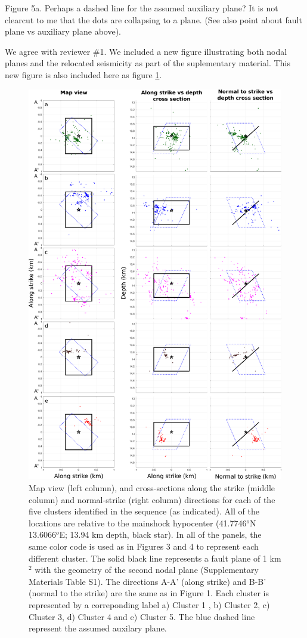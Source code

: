 \documentclass[10pt]{extarticle}
\begin{document}
\begin{ReviewerComment}{1}
\noindent 
Figure 5a. Perhaps a dashed line for the assumed auxiliary plane? It is not clearcut to me that the dots are collapsing to a plane. (See also point about fault plane vs auxiliary plane above).
\end{ReviewerComment}


\begin{Answer}
We agree with reviewer \#1. We included a new figure illustrating both nodal planes and the relocated seismicity as part of the suplementary material. This new figure is also included here as figure \ref{fig:map_improved_np1_np2}.
 \WorkInProgressRevTask
\begin{figure}[!h]
\begin{center}
 \includegraphics[width=0.7\linewidth]{S3_NP1_NP2_map_cluesters} 
\end{center}
\caption{Map view (left column), and cross-sections along the strike (middle column) and normal-strike (right column) directions for each of the five clusters identified in the sequence (as indicated). All of the locations are relative to the mainshock hypocenter (41.7746$^o$N 13.6066$^o$E; 13.94 km depth, black star). In all of the panels, the same color code is used as in Figures 3 and 4 to represent each different cluster. The solid black line represents a fault plane of 1 km$^2$ with the geometry of the second nodal plane (Supplementary Materials Table S1). The directions A-A' (along strike) and B-B' (normal to the strike) are the same as in Figure 1. Each cluster is represented by a correponding label a) Cluster 1 , b) Cluster 2, c) Cluster 3, d) Cluster 4 and e) Cluster 5. The blue dashed line represent the assumed auxilary plane.}
\label{fig:map_improved_np1_np2}
\end{figure}
\end{Answer}
%
%
\end{document}
